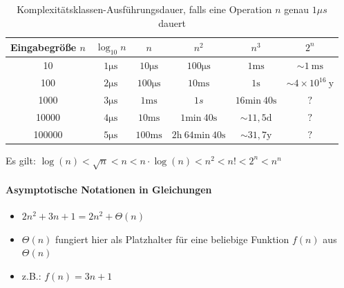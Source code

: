 \documentclass[
    ngerman,
    color=3b,
    dark_mode,
    load_common, %
    summary,
    boxarc,
]{rubos-tuda-template}
\begin{document}
\begin{table}[ht]
    \centering
    \renewcommand{\arraystretch}{1.2}
    \begin{tabular}{cccccc}
        \toprule
        Eingabegrö\ss{}e $n$ & $\log_{10} n$     & $n$                 & $n^2$                                     & $n^3$                         & $2^n$                             \\
        \midrule
        10                   & $1\mathrm{\mu s}$ & $10\mathrm{\mu s}$  & $100\mathrm{\mu s}$                       & $1\mathrm{ms}$                & $\sim 1~\mathrm{ms}$              \\
        100                  & $2\mathrm{\mu s}$ & $100\mathrm{\mu s}$ & $10\mathrm{ms}$                           & $1\mathrm{s}$                 & $\sim 4\times 10^{16}~\mathrm{y}$ \\
        1000                 & $3\mathrm{\mu s}$ & $1\mathrm{ms}$      & $1s$                                      & $16\mathrm{min}~40\mathrm{s}$ & $?$                               \\
        10000                & $4\mathrm{\mu s}$ & $10\mathrm{ms}$     & $1\mathrm{min}~40\mathrm{s}$              & $\sim 11,5\mathrm{d}$         & $?$                               \\
        100000               & $5\mathrm{\mu s}$ & $100\mathrm{ms}$    & $2\mathrm{h}~64\mathrm{min}~40\mathrm{s}$ & $\sim 31,7\mathrm{y}$         & $?$                               \\
        \bottomrule
    \end{tabular}
    \caption{Komplexitätsklassen-Ausführungsdauer, falls eine Operation $n$ genau $1\mu s$ dauert}
    \label{tab:komplexitaetsklassen-Ausfuehrungezeit}
\end{table}

Es gilt: $\log(n) < \sqrt{n} < n < n\cdot \log(n) < n^2 < n! < 2^n<n^n$
\vspace*{-2ex}
\paragraph{Asymptotische Notationen in Gleichungen}
\begin{itemize}
    \item $2n^2 + 3n + 1 = 2n^2 + \Theta(n)$
    \item $\Theta(n)$ fungiert hier als Platzhalter für eine beliebige Funktion $f(n)$ aus $\Theta(n)$
    \item z.B.: $f(n) = 3n + 1$
\end{itemize}
\vspace*{-2ex}
\end{document}
